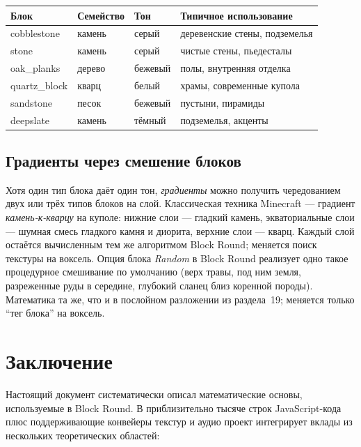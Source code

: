 \documentclass[12pt,a4paper]{scrartcl}
\begin{document}
\vspace{0.4em}
\begin{center}
\begin{tabular}{@{}llll@{}}
\toprule
\textbf{Блок} & \textbf{Семейство} & \textbf{Тон} & \textbf{Типичное использование} \\
\midrule
cobblestone        & камень  & серый  & деревенские стены, подземелья \\
stone              & камень  & серый  & чистые стены, пьедесталы \\
oak\_planks        & дерево   & бежевый   & полы, внутренняя отделка \\
quartz\_block      & кварц    & белый   & храмы, современные купола \\
sandstone          & песок   & бежевый   & пустыни, пирамиды \\
deepslate          & камень  & тёмный  & подземелья, акценты \\
\bottomrule
\end{tabular}
\end{center}

\subsection{Градиенты через смешение блоков}
Хотя один тип блока даёт один тон, \emph{градиенты} можно получить чередованием двух или трёх типов блоков на слой. Классическая техника Minecraft — градиент \emph{камень-к-кварцу} на куполе: нижние слои — гладкий камень, экваториальные слои — шумная смесь гладкого камня и диорита, верхние слои — кварц. Каждый слой остаётся вычисленным тем же алгоритмом Block Round; меняется поиск текстуры на воксель. Опция блока \emph{Random} в Block Round реализует одно такое процедурное смешивание по умолчанию (верх травы, под ним земля, разреженные руды в середине, глубокий сланец близ коренной породы). Математика та же, что и в послойном разложении из раздела~19; меняется только \enquote{тег блока} на воксель.

\section{Заключение}

Настоящий документ систематически описал математические основы, используемые в Block Round. В приблизительно тысяче строк JavaScript-кода плюс поддерживающие конвейеры текстур и аудио проект интегрирует вклады из нескольких теоретических областей:
\end{document}
